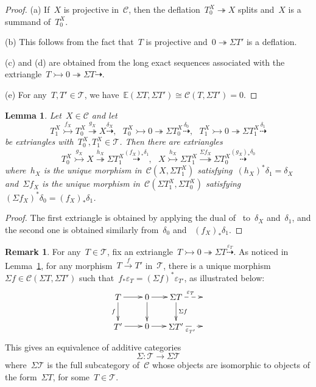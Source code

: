 \documentclass{amsart}
\newtheorem{lemma}[theorem]{Lemma}
\theoremstyle{definition}
\newtheorem{remark}[theorem]{Remark}
\newcommand{\cat}{\mathcal{C}}
\newcommand{\susp}{\Sigma}
\newcommand{\tc}{\mathcal{T}}
\newcommand{\infl}{\rightarrowtail}
\newcommand{\defl}{\twoheadrightarrow}
\newcommand{\eps}{\varepsilon}
\begin{document}
\begin{proof}
(a) If~$X$ is projective in~$\cat$, then the deflation~$T_0^X\defl X$ splits and~$X$ is a summand of~$T_0^X$.

(b) This follows from the fact that~$T$ is projective and~$0\defl\susp T'$ is a deflation.

(c) and (d) are obtained from the long exact sequences associated with the extriangle~$T\infl 0\defl \susp T\dashrightarrow$.

(e) For any~$T,T'\in\tc$, we have~$\mathbb{E}(\susp T,\susp T') \cong \cat(T,\susp T')=0$.
\end{proof}

\begin{lemma}\label{lemma::shifts of extriangles}
Let~$X\in\cat$ and let
\[
T_1^X\overset{f_X}{\infl} T_0^X\overset{g_X}{\defl} X \overset{\delta_X}{\dashrightarrow}, \ \ \ T_0^X\infl 0\defl \susp T_0^X\overset{\delta_0}{\dashrightarrow}, \ \ \ T_1^X\infl 0\defl \susp T_1^X\overset{\delta_1}{\dashrightarrow}
\]
be extriangles with~$T_0^X,T_1^X\in\tc$.
Then there are extriangles
\[
T_0^X\overset{g_X}{\infl} X \overset{h_X}{\defl} \susp T_1^X \overset{(f_X)_\ast\delta_1}{\dashrightarrow}, \ \ \ X \overset{h_X}{\infl} \susp T_1^X \overset{\susp f_X}{\defl} \susp T_0^X \overset{(g_X)_\ast\delta_0}{\dashrightarrow}
\]
where~$h_X$ is the unique morphism in~$\cat(X,\susp T_1^X)$ satisfying~$(h_X)^\ast\delta_1=\delta_X$ and~$\susp f_X$ is the unique morphism in~$\cat(\susp T_1^X,\susp T_0^X)$ satisfying~$(\susp f_X)^\ast\delta_0 = (f_X)_\ast\delta_1$.
\end{lemma}

\begin{proof}
The first extriangle is obtained by applying the dual of~\cite[Proposition 3.15]{NakaokaPalu} to~$\delta_X$ and~$\delta_1$, and the second one is obtained similarly from~$\delta_0$ and ~$(f_X)_\ast \delta_1$.
\end{proof}

\begin{remark}\label{remark::equivalence Sigma}
For any~$T\in\tc$, fix an extriangle~$T\infl 0\defl\susp T\overset{\eps_T}{\dashrightarrow}$.
As noticed in Lemma~\ref{lemma::shifts of extriangles}, for any morphism~$T\overset{f}{\to}T'$ in~$\tc$, there is a unique morphism~$\susp f\in\cat(\susp T,\susp T')$ such that~$f_\ast\eps_T=(\susp f)^\ast\eps_{T'}$, as illustrated below:
\[
\xy
(-12,6)*+{T}="0";
(0,6)*+{0}="2";
(12,6)*+{\susp T}="4";
(24,6)*+{}="6";
%
(-12,-6)*+{T'}="10";
(0,-6)*+{0}="12";
(12,-6)*+{\susp T'}="14";
(24,-6)*+{}="16";
%
{\ar "0";"2"};
{\ar "2";"4"};
{\ar@{-->}^{\eps_T} "4";"6"};
%
{\ar_{f} "0";"10"};
{\ar "2";"12"};
{\ar^{\susp f} "4";"14"};
%
{\ar "10";"12"};
{\ar "12";"14"};
{\ar@{-->}_{\eps_{T'}} "14";"16"};
\endxy
\]
This gives an equivalence of additive categories
\[
 \susp: \tc \to \susp\tc
\]
where~$\susp\tc$ is the full subcategory of~$\cat$ whose objects are isomorphic to objects of the form~$\susp T$, for some~$T\in\tc$.
\end{remark}
\end{document}

